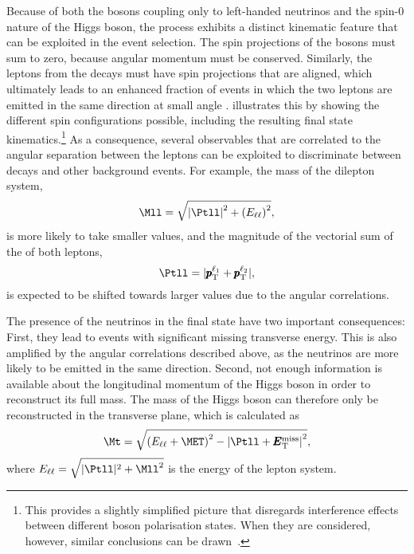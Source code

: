 Because of both the \Wboson bosons coupling only to left-handed neutrinos and the spin-0 nature of the Higgs boson, the \HWWdet process exhibits a distinct kinematic feature that can be exploited in the event selection.
The spin projections of the \Wboson bosons must sum to zero, because angular momentum must be conserved.
Similarly, the leptons from the \Wboson decays must have spin projections that are aligned, which ultimately leads to
an enhanced fraction of \HWWdet events in which the two leptons are emitted in the same direction at small angle \DPhill.
 illustrates this by showing the different spin configurations possible, including the resulting final state kinematics.\footnote{This provides a slightly simplified picture that disregards interference effects between different \Wboson boson polarisation states. When they are considered, however, similar conclusions can be drawn~\cite{Maina_2021}.}
As a consequence, several observables that are correlated to the angular separation between the leptons can be exploited to discriminate between \HWW decays and other background events. For example, the mass of the dilepton system,
\begin{equation}
    \Mll = \sqrt{\left| \Ptll \right|^2+ \left( E_{\ell\ell} \right)^2},
\end{equation}
is more likely to take smaller values, and the magnitude of the vectorial sum of the \pT of both leptons,
\begin{equation}
    \Ptll = |\pmb{p}_\text{T}^{\ell_1} + \pmb{p}_\text{T}^{\ell_2}|,
\end{equation}
is expected to be shifted towards larger values due to the angular correlations. 

The presence of the neutrinos in the final state have two important consequences:
First, they lead to events with significant missing transverse energy. This is also amplified by the angular correlations described above, as the neutrinos are more likely to be emitted in the same direction. 
Second, not enough information is available about the longitudinal momentum of the Higgs boson in order to reconstruct its full mass. The mass of the Higgs boson can therefore only be reconstructed in the transverse plane, which is calculated as
\begin{equation}
  \Mt = \sqrt{ \left( E_{\ell\ell}+\MET \right)^2 - \left| \Ptll + \pmb{E}_{\text{T}}^{\text{miss}} \right|^2 },
\end{equation}
where $E_{\ell\ell} = \sqrt{ |\Ptll|^2 + \Mll^2}$ is the energy of the lepton system.

